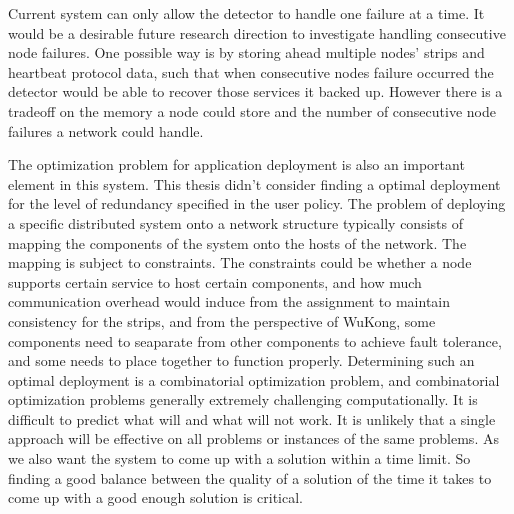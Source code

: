 Current system can only allow the detector to handle one failure at a time. It
would be a desirable future research direction to investigate handling
consecutive node failures. One possible way is by storing ahead multiple nodes'
strips and heartbeat protocol data, such that when consecutive nodes failure
occurred the detector would be able to recover those services it backed up.
However there is a tradeoff on the memory a node could store and the number of
consecutive node failures a network could handle.

\begin{comment}
Niels suggested that I show that I am aware of such issue with determining
optimality for deployment which is not clear for WuKong yet, there are many
ways or metrics to optimize for, all I can do in this work is to identify some
tradeoffs certain deployment for fault tolerance could influence the system
with certain metrics.

Limits will be hard to define here
Niels:about the tradeoffs in determining the deployment from your fault
tolerance perspective
Penn:Remember what the prof told me, about policy, first fit, last fit, etc
\end{comment}

The optimization problem for application deployment is also an important element
in this system. This thesis didn't consider finding a optimal deployment for the
level of redundancy specified in the user policy. The problem of deploying
a specific distributed system onto a network structure typically consists of
mapping the components of the system onto the hosts of the network. The mapping
is subject to constraints. The constraints could be whether a node supports
certain service to host certain components, and how much communication overhead
would induce from the assignment to maintain consistency for the strips, and
from the perspective of WuKong, some components need to seaparate from other
components to achieve fault tolerance, and some needs to place together to
function properly.  Determining such an optimal deployment is a combinatorial
optimization problem, and combinatorial optimization problems generally
extremely challenging computationally. It is difficult to predict what will and
what will not work.  It is unlikely that a single approach will be effective on
all problems or instances of the same problems. As we also want the system to
come up with a solution within a time limit. So finding a good balance between
the quality of a solution of the time it takes to come up with a good enough
solution is critical.

